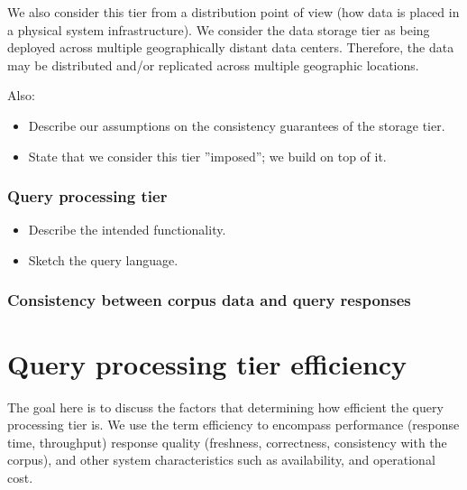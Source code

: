
We also consider this tier from a distribution point of view (how data is placed in a physical system infrastructure).
We consider the data storage tier as being deployed across multiple geographically distant data centers.
Therefore, the data may be distributed and/or replicated across multiple geographic locations.

Also:
\begin{itemize}
  \item Describe our assumptions on the consistency guarantees of the storage tier.
  \item State that we consider this tier ''imposed''; we build on top of it.
\end{itemize}

\subsubsection{Query processing tier}

\begin{itemize}
  \item Describe the intended functionality.
  \item Sketch the query language.
\end{itemize}


\subsubsection{Consistency between corpus data and query responses}

\section{Query processing tier efficiency}
\label{sec:requirements}

The goal here is to discuss the factors that determining how efficient the query processing tier is.
We use the term efficiency to encompass performance (response time, throughput) response quality (freshness,
correctness, consistency with the corpus), and other system characteristics such as availability, and operational cost.

